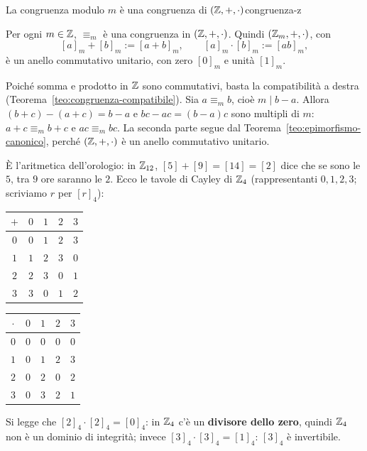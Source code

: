 \begin{concetto}
\begin{Proposizione}{La congruenza modulo $m$ è una congruenza di $(\mathbb{Z}, +, \cdot)$}{congruenza-z}
    \begin{prerequisiti}
    \end{prerequisiti}
    Per ogni $m \in \mathbb{Z}$, $\equiv_m$ è una congruenza in $(\mathbb{Z}, +, \cdot)$. Quindi $(\mathbb{Z}_m, +, \cdot)$, con
    \[ [a]_m + [b]_m := [a + b]_m, \qquad [a]_m \cdot [b]_m := [ab]_m, \]
    è un anello commutativo unitario, con zero $[0]_m$ e unità $[1]_m$.
\end{Proposizione}
\begin{dimostrazione}
    Poiché somma e prodotto in $\mathbb{Z}$ sono commutativi, basta la compatibilità a destra (Teorema~\ref{teo:congruenza-compatibile}). Sia
    $a \equiv_m b$, cioè $m \mid b - a$. Allora $(b + c) - (a + c) = b - a$ e $bc - ac = (b - a)c$ sono multipli di $m$: $a + c \equiv_m b + c$ e
    $ac \equiv_m bc$. La seconda parte segue dal Teorema~\ref{teo:epimorfismo-canonico}, perché $(\mathbb{Z}, +, \cdot)$ è un anello commutativo unitario.
\end{dimostrazione}
\end{concetto}

\begin{spiegazione}
    È l'aritmetica dell'orologio: in $\mathbb{Z}_{12}$, $[5] + [9] = [14] = [2]$ dice che se sono le $5$, tra $9$ ore saranno le $2$. Ecco le tavole
    di Cayley di $\mathbb{Z}_4$ (rappresentanti $0, 1, 2, 3$; scriviamo $r$ per $[r]_4$):
    \begin{center}
    \renewcommand{\arraystretch}{1.2}
    \begin{tabular}{c|cccc}
        $+$ & $0$ & $1$ & $2$ & $3$ \\ \hline
        $0$ & $0$ & $1$ & $2$ & $3$ \\
        $1$ & $1$ & $2$ & $3$ & $0$ \\
        $2$ & $2$ & $3$ & $0$ & $1$ \\
        $3$ & $3$ & $0$ & $1$ & $2$ \\
    \end{tabular}
    \qquad\qquad
    \begin{tabular}{c|cccc}
        $\cdot$ & $0$ & $1$ & $2$ & $3$ \\ \hline
        $0$ & $0$ & $0$ & $0$ & $0$ \\
        $1$ & $0$ & $1$ & $2$ & $3$ \\
        $2$ & $0$ & $2$ & \cellcolor{cherryred!20}$0$ & $2$ \\
        $3$ & $0$ & $3$ & $2$ & \cellcolor{seagreen!25}$1$ \\
    \end{tabular}
    \end{center}
    Si legge che $[2]_4 \cdot [2]_4 = [0]_4$: in $\mathbb{Z}_4$ c'è un \textbf{divisore dello zero}, quindi $\mathbb{Z}_4$ non è un dominio di integrità; invece
    $[3]_4 \cdot [3]_4 = [1]_4$: $[3]_4$ è invertibile.
\end{spiegazione}

